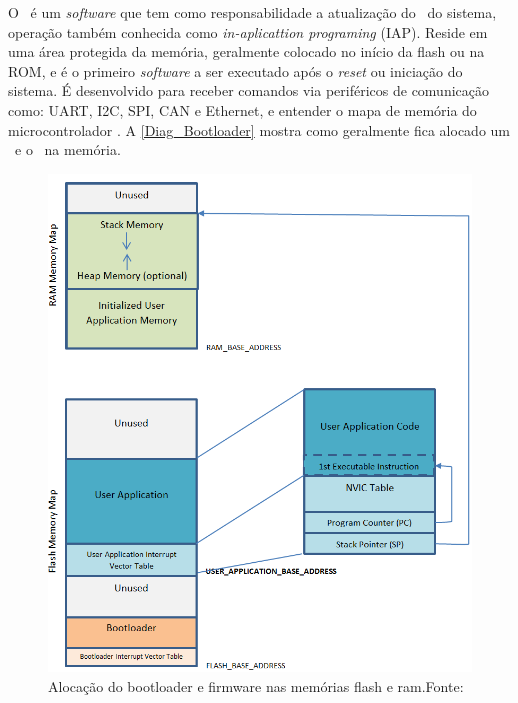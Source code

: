 O \bootloader\ é um \textit{software} que tem como responsabilidade a atualização do \firmware\ do sistema, operação também conhecida como \textit{in-aplicattion programing} (IAP). Reside em uma área protegida da memória, geralmente colocado no início da flash ou na ROM, e é o primeiro \textit{software} a ser executado após o \textit{reset} ou iniciação do sistema.
É desenvolvido para receber comandos via periféricos de comunicação como: UART, I2C, SPI, CAN e Ethernet, e entender o mapa de memória do microcontrolador \cite{DavesDurlin2013}. A \autoref{Diag_Bootloader} mostra como geralmente fica alocado um \bootloader\ e o \firmware\ na memória.

\begin{figure}[H]
    \scriptsize
     \centering
     \includegraphics[scale=0.7]{dados/figuras/DiagBootloaderOriginal.png}
     \caption{Alocação do bootloader e firmware nas memórias flash e ram.\newline Fonte:\cite{DavesDurlin2013}}
     \label{Diag_Bootloader}
\end{figure}

